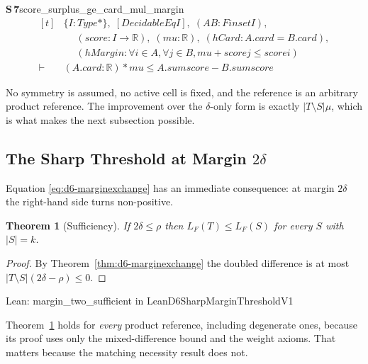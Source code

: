 \documentclass[conference]{IEEEtran}
\newtheorem{theorem}{Theorem}
\theoremstyle{definition}
\newcommand{\lean}[1]{\textsf{\footnotesize #1}}
\newcommand{\leanbox}[1]{%
  \par\vspace{2pt}\noindent
  {\footnotesize\textsf{Lean: #1}}\par\vspace{2pt}}
\begin{document}
\noindent\textbf{S\,7}\quad\lean{score\_surplus\_ge\_card\_mul\_margin}
{\footnotesize\[ \begin{aligned}[t]
&\{ \mathit{I} : \mathit{Type}*\},\; [\mathit{DecidableEq} \mathit{I}],\; (\mathit{A} \mathit{B} : \mathit{Finset} \mathit{I}),\\
&\quad \; (\mathit{score} : \mathit{I} \to \mathbb{R} ),\; (\mathit{mu} : \mathbb{R} ),\; (\mathit{hCard} : \mathit{A}.\mathit{card} = \mathit{B}.\mathit{card}),\\
&\quad \; (\mathit{hMargin} : \forall \mathit{i} \in \mathit{A}, \forall \mathit{j} \in \mathit{B}, \mathit{mu} + \mathit{score} \mathit{j} \leq \mathit{score} \mathit{i})\\
\vdash\;&(\mathit{A}.\mathit{card} : \mathbb{R} ) * \mathit{mu} \leq \mathit{A}.\mathit{sum} \mathit{score} - \mathit{B}.\mathit{sum} \mathit{score}
\end{aligned} \]}


No symmetry is assumed, no active cell is fixed, and the reference is an arbitrary product
reference. The improvement over the $\delta$-only form is exactly $|T\setminus S|\mu$, which
is what makes the next subsection possible.

\subsection{The Sharp Threshold at Margin $2\delta$}
\label{sec:d6-threshold}

Equation \eqref{eq:d6-marginexchange} has an immediate consequence: at margin $2\delta$ the
right-hand side turns non-positive.

\begin{theorem}[Sufficiency]
\label{thm:d6-sufficient}
If $2\delta\leq\rho$ then $L_{F}(T)\leq L_{F}(S)$ for every $S$ with $|S|=k$.
\end{theorem}

\begin{proof}
By Theorem~\ref{thm:d6-marginexchange} the doubled difference is at most
$|T\setminus S|(2\delta-\rho)\le0$.
\end{proof}

\leanbox{\lean{margin\_two\_sufficient} in \lean{LeanD6SharpMarginThresholdV1}}

Theorem~\ref{thm:d6-sufficient} holds for \emph{every} product reference, including degenerate
ones, because its proof uses only the mixed-difference bound and the weight axioms. That
matters because the matching necessity result does not.
\end{document}
